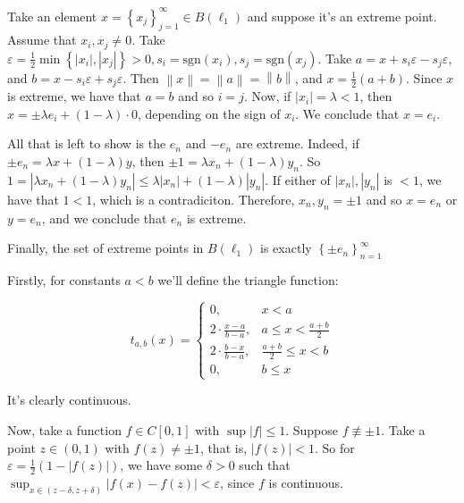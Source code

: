 \documentclass[11pt]{article} %
\newcommand{\norm}[1]{\left\lVert#1\right\rVert}
\begin{document}
\begin{Answer}
\begin{enumerate}
\begin{item}
Take an element $x =\left\{x_j\right\}_{j=1}^\infty \in B\left(\ell_1\right)$ and suppose it's an extreme point. Assume that $x_i, x_j \neq 0$. Take $\varepsilon = \frac{1}{2} \min\left\{\left|x_i\right|, \left|x_j\right|\right\} > 0, s_i = \text{sgn}\left(x_i\right), s_j = \text{sgn}\left(x_j\right)$. Take $a = x + s_i\varepsilon - s_j\varepsilon$, and $b = x - s_i\varepsilon + s_j\varepsilon$. Then $\norm{x} = \norm{a} = \norm{b}$, and $x = \frac{1}{2}\left(a + b\right)$. Since $x$ is extreme, we have that $a = b$ and so $i =j$.
Now, if $\left|x_i\right| = \lambda< 1$, then $x = \pm \lambda e_i + \left(1-\lambda\right)\cdot 0$, depending on the sign of $x_i$.
We conclude that $x = e_i$.

All that is left to show is the $e_n$ and $-e_n$ are extreme. Indeed, if $\pm e_n = \lambda x + \left(1-\lambda\right) y$, then $\pm 1 = \lambda x_n + \left(1 -\lambda\right) y_n$. So $1 = \left|\lambda x_n + \left(1 - \lambda \right)y_n\right| \leq \lambda \left|x_n\right| + \left(1-\lambda\right)\left|y_n\right|$. If either of $\left|x_n\right|, \left|y_n\right|$ is $< 1$, we have that $1 < 1$, which is a contradiciton. Therefore, $x_n, y_n = \pm1$ and so $x = e_n$ or $y = e_n$, and we conclude that $e_n$ is extreme.

Finally, the set of extreme points in $B\left(\ell_1\right)$ is exactly $\left\{\pm e_n\right\}_{n=1}^\infty$
\end{item}
\begin{item}
Firstly, for constants $a < b$ we'll define the triangle function:

\[
	t_{a,b}\left(x\right) = 
\begin{cases}
0, & x < a \\
2\cdot\frac{x - a}{b - a}, & a \leq x < \frac{a + b}{2} \\
2\cdot\frac{b - x}{b - a}, & \frac{a + b}{2} \leq x < b \\
0, & b \leq x
\end{cases}
\]

It's clearly continuous.

Now, take a function $f \in C\left[0,1\right]$ with $\sup\left|f\right| \leq 1$. Suppose $f \not \equiv \pm 1$. Take a point $z \in \left(0,1\right)$ with $f\left(z\right) \neq \pm 1$, that is, $\left|f\left(z\right)\right| < 1$. So for $\varepsilon = \frac{1}{2}\left(1 - \left|f\left(z\right)\right|\right)$, we have some $\delta > 0$ such that $\sup_{x\in\left(z-\delta, z+\delta\right)}\left|f\left(x\right)-f\left(z\right)\right| < \varepsilon$, since $f$ is continuous.


\end{item}
\end{enumerate}
\end{Answer}
\end{document}
